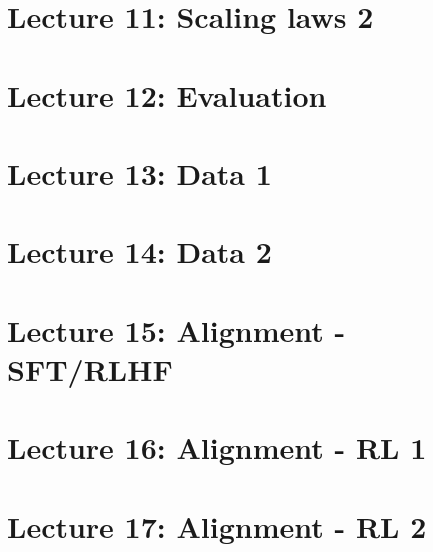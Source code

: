\documentclass[a4paper]{article}
\begin{document}
\section{Lecture 11: Scaling laws 2}


\section{Lecture 12: Evaluation}


\section{Lecture 13: Data 1}


\section{Lecture 14: Data 2}


\section{Lecture 15: Alignment - SFT/RLHF}


\section{Lecture 16: Alignment - RL 1}


\section{Lecture 17: Alignment - RL 2}

\end{document}
